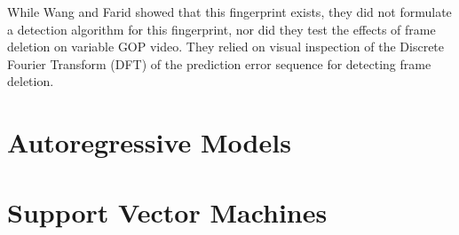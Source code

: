 While Wang and Farid showed that this fingerprint exists, they did not formulate a detection algorithm for this fingerprint, nor did they test the effects of frame deletion on variable GOP video. They relied on visual inspection of the Discrete Fourier Transform (DFT) of the prediction error sequence for detecting frame deletion.



\section{Autoregressive Models}

\section{Support Vector Machines}
